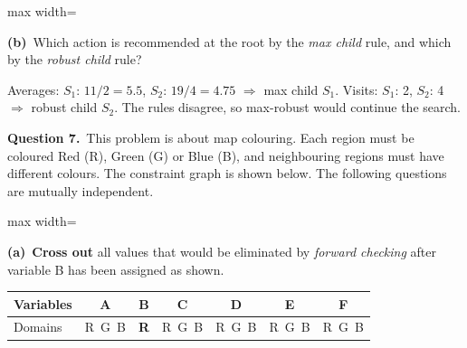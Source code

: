 \documentclass[11pt,a4paper]{article}
\newcommand{\question}[1]{\par\medskip\noindent\textbf{Question #1.}\ }
\newcommand{\subq}[1]{\par\smallskip\noindent\textbf{#1}\ }
\begin{document}
\begin{solbox}
\begin{center}
\begin{adjustbox}{max width=\linewidth}
\end{adjustbox}
\end{center}
\end{solbox}
\subq{(b)}Which action is recommended at the root by the \emph{max child} rule, and which by the \emph{robust child} rule?
\begin{solbox}
Averages: $S_1$: $11/2=5.5$, $S_2$: $19/4=4.75$ $\Rightarrow$ max child \textbf{$S_1$}. Visits: $S_1$: 2, $S_2$: 4 $\Rightarrow$ robust child \textbf{$S_2$}. The rules disagree, so max-robust would continue the search.
\end{solbox}
\question{7}This problem is about map colouring. Each region must be coloured Red (R), Green (G) or Blue (B), and neighbouring regions must have different colours. The constraint graph is shown below. The following questions are mutually independent.\begin{center}
\begin{adjustbox}{max width=\linewidth}
\end{adjustbox}
\end{center}
\subq{(a)}\textbf{Cross out} all values that would be eliminated by \emph{forward checking} after variable B has been assigned as shown.\begin{center}\small\begin{tabular}{|l|c|c|c|c|c|c|}\hline Variables & \textbf{A} & \textbf{B} & \textbf{C} & \textbf{D} & \textbf{E} & \textbf{F}\\ \hline Domains & R\ G\ B & \textbf{R} & R\ G\ B & R\ G\ B & R\ G\ B & R\ G\ B\\ \hline\end{tabular}\end{center}
\end{document}
